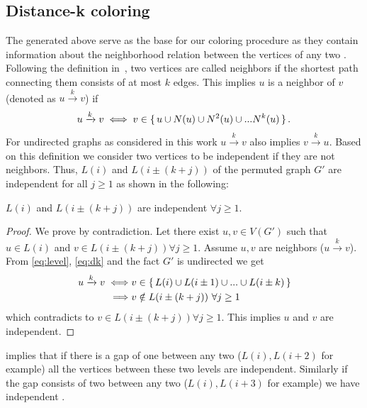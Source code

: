  \subsection{Distance-k coloring} \label{subsec:DK}
 The \levels generated above serve as the base for our \DK coloring procedure as they contain information about the neighborhood relation between the vertices of any two \levels. Following the definition in~\cite{dist_k_def}, two vertices are called \DK neighbors if the shortest path connecting them consists of at most $k$ edges.
This implies $u$ is a \DK neighbor of $v$ (denoted as $u\xrightarrow{k}v$)  if
 \begin{equation}\label{eq:dk}
	  u\xrightarrow{k}v  \iff  v \in \set{ u \cup N(u) \cup N^2(u) \cup ... N^k(u) }.	 
 \end{equation}
 For undirected graphs as considered in this work  $u\xrightarrow{k}v$ also implies $v\xrightarrow{k}u$. Based on this definition we consider two vertices to be \DK independent if they are not \DK neighbors. Thus,  \levels $L(i)$ and $L(i\pm(k+j))$  of the permuted graph $G'$ are \DK independent for all $j\geq1$ as shown in the following:
  \begin{corollary}\label{corollary_dk}
   $L(i)$ and $L(i\pm(k+j))$ are \DK independent $\forall j\geq1$. 
  \end{corollary}
  \begin{proof}
  	We prove by contradiction. Let there exist $u,v \in V(G')$ such that  $u \in L(i)$ and $v \in  L(i \pm (k+j)) \forall j\geq1$. Assume $u,v$ are \DK neighbors ($u\xrightarrow{k}v$). From \cref{eq:level}, \cref{eq:dk} and the fact $G'$ is undirected we get 
  	\begin{align*}
	  	u\xrightarrow{k}v \iff & v \in \set{L(i) \cup L(i \pm 1) \cup ... \cup L(i \pm k)} \\
	  	\implies & v \notin L(i \pm (k+j)) \text{  } \forall j \geq 1
  	\end{align*}
  	which contradicts to $v \in L(i \pm (k+j) ) \forall j \geq 1$. This implies $u$ and $v$ are \DK independent.
  \end{proof}

 implies that if there is a gap of \emph{\atleast} one \level between any two \levels ($L(i), L(i+2)$ for example) all the vertices between these two levels are \DONE independent. Similarly if the gap consists of \emph{\atleast} two \levels between any two \levels ($L(i), L(i+3)$ for example) we have \DTWO independent \levels.
  
